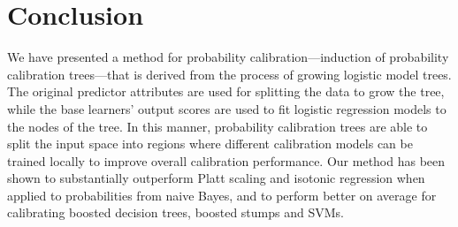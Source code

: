 \documentclass[wcp]{jmlr}
\begin{document}
\section{\label{sec:conclusion}Conclusion}
We have presented a method for probability calibration---induction of probability calibration trees---that is derived from the process of growing logistic model trees. The original predictor attributes are used for splitting the data to grow the tree, while the base learners' output scores are used to fit logistic regression models to the nodes of the tree. In this manner, probability calibration trees are able to split the input space into regions where different calibration models can be trained locally to improve overall calibration performance. Our method has been shown to substantially outperform Platt scaling and isotonic regression when applied to probabilities from naive Bayes, and to perform better on average for calibrating boosted decision trees, boosted stumps and SVMs. 


%

\end{document}

